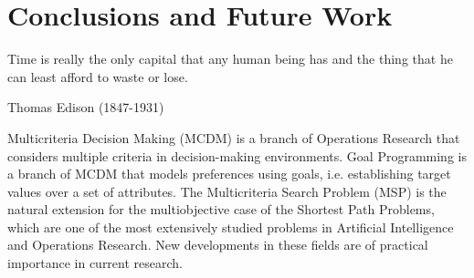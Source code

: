 %
%
%
%
%
%

\chapter{Conclusions and Future Work}
\label{ChapConclusions}
%
\begin{FraseCelebre}
\begin{Frase}
Time is really the only capital that any human being has and the thing that he can least afford to waste or lose.
\end{Frase}
\begin{Fuente}
Thomas Edison (1847-1931)
\end{Fuente}
\end{FraseCelebre}
%

Multicriteria Decision Making (MCDM) is a branch of Operations Research that considers multiple criteria in decision-making environments. Goal Programming is a branch of MCDM that models preferences using goals, i.e. establishing target values over a set of attributes. The Multicriteria Search Problem (MSP) is the natural extension for the multiobjective case of the Shortest Path Problems, which are one of the most extensively studied problems in Artificial Intelligence and Operations Research. New developments in these fields are of practical importance in current research.

